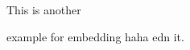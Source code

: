 

    This is another
    \begin{comment}
        rather stupid,
        but helpful
    \end{comment}
    example for embedding haha edn it.